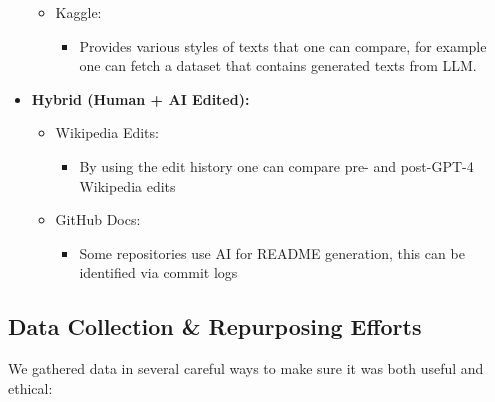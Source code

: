 \documentclass{article} %
\begin{document}
\begin{itemize}
\begin{itemize}
         \item Kaggle:
        \begin{itemize}
            \item Provides various styles of texts that one can compare, for example one can fetch a dataset that contains generated texts from LLM.
        \end{itemize}
    \end{itemize}
    
    \item \textbf{Hybrid (Human + AI Edited):}
    \begin{itemize}
        \item Wikipedia Edits:
        \begin{itemize}
            \item By using the edit history one can compare pre- and post-GPT-4 Wikipedia edits
        \end{itemize}
        
        \item GitHub Docs:
        \begin{itemize}
            \item Some repositories use AI for README generation, this can be identified via commit logs
        \end{itemize}
    \end{itemize}
\end{itemize}

\subsection{Data Collection \& Repurposing Efforts}
We gathered data in several careful ways to make sure it was both useful and ethical:
\end{document}
